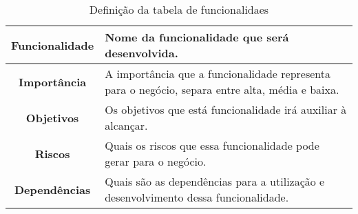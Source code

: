     \begin{table}[h!]
      \centering
      \begin{tabular}{|c|p{10cm}|}
        \hline
        \textbf{Funcionalidade} &
        Nome da funcionalidade que será desenvolvida. \\ \hline
        \textbf{Importância} &
        A importância que a funcionalidade representa para o negócio, separa entre
        alta, média e baixa. \\ \hline
        \textbf{Objetivos} &
        Os objetivos que está funcionalidade irá auxiliar à alcançar. \\ \hline
        \textbf{Riscos} &
        Quais os riscos que essa funcionalidade pode gerar para o negócio. \\ \hline
        \textbf{Dependências} &
        Quais são as dependências para a utilização e desenvolvimento dessa
        funcionalidade. \\ \hline
      \end{tabular}
      \caption{Definição da tabela de funcionalidaes}
      \label{Tabela:1}
    \end{table}

